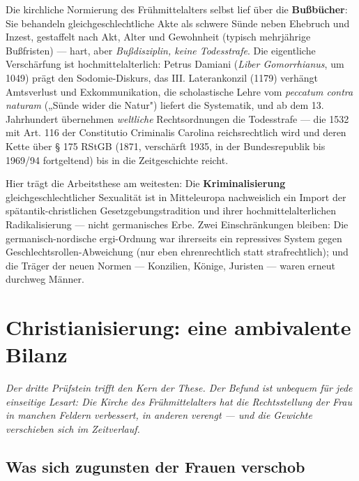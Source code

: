 \documentclass[11pt,a4paper,ngerman]{scrartcl}
\newcommand{\chipbase}[2]{\hspace{0pt}{\footnotesize\textcolor{#1}{[\textsc{#2}]}}}
\newcommand{\chipbelegt}[1]{\chipbase{chipgreen}{#1}}
\newcommand{\chipplausibel}[1]{\chipbase{chipamber}{#1}}
\newenvironment{callout}[2]{%
  \def\FrameCommand{{\color{#1}\vrule width 2pt}\hspace{8pt}}%
  \MakeFramed{\advance\hsize-\width\FrameRestore}%
  \noindent{\small\scshape\color{#1}#2}\par\smallskip\small
}{\endMakeFramed\medskip}
\begin{document}
Die kirchliche Normierung des Frühmittelalters selbst lief über die \textbf{Bußbücher}: Sie behandeln gleichgeschlechtliche Akte als schwere Sünde neben Ehebruch und Inzest, gestaffelt nach Akt, Alter und Gewohnheit (typisch mehrjährige Bußfristen) — hart, aber \emph{Bußdisziplin, keine Todesstrafe}. Die eigentliche Verschärfung ist hochmittelalterlich: Petrus Damiani (\emph{Liber Gomorrhianus}, um 1049) prägt den Sodomie-Diskurs, das III. Laterankonzil (1179) verhängt Amtsverlust und Exkommunikation, die scholastische Lehre vom \emph{peccatum contra naturam} („Sünde wider die Natur") liefert die Systematik, und ab dem 13. Jahrhundert übernehmen \emph{weltliche} Rechtsordnungen die Todesstrafe — die 1532 mit Art. 116 der Constitutio Criminalis Carolina reichsrechtlich wird und deren Kette über § 175 RStGB (1871, verschärft 1935, in der Bundesrepublik bis 1969/94 fortgeltend) bis in die Zeitgeschichte reicht. \chipbelegt{belegt}

\begin{callout}{gold}{Relevanz für die These}
Hier trägt die Arbeitsthese am weitesten: Die \textbf{Kriminalisierung} gleichgeschlechtlicher Sexualität ist in Mitteleuropa nachweislich ein Import der spätantik-christlichen Gesetzgebungstradition und ihrer hochmittelalterlichen Radikalisierung — nicht germanisches Erbe. Zwei Einschränkungen bleiben: Die germanisch-nordische ergi-Ordnung war ihrerseits ein repressives System gegen Geschlechtsrollen-Abweichung (nur eben ehrenrechtlich statt strafrechtlich); und die Träger der neuen Normen — Konzilien, Könige, Juristen — waren erneut durchweg Männer. \chipplausibel{plausibel}
\end{callout}


\section{Christianisierung: eine ambivalente Bilanz}

\noindent\textit{Der dritte Prüfstein trifft den Kern der These. Der Befund ist unbequem für jede einseitige Lesart: Die Kirche des Frühmittelalters hat die Rechtsstellung der Frau in manchen Feldern \emph{verbessert}, in anderen \emph{verengt} — und die Gewichte verschieben sich im Zeitverlauf.}
\medskip

\subsection*{Was sich zugunsten der Frauen verschob}
\end{document}

